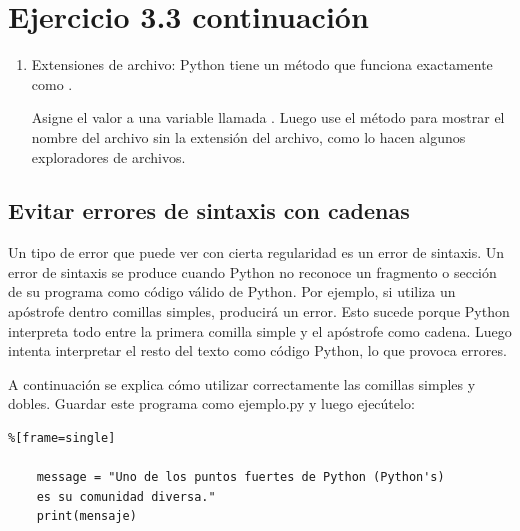 \section*{Ejercicio 3.3 continuación}\label{Tarea3}

\begin{enumerate}[3.3.5]
	
	\item Extensiones de archivo: Python tiene un método {} que funciona exactamente
	como {}. 
	
	Asigne el valor {} a una variable llamada
	{}. Luego use el método {} para mostrar el nombre del archivo sin
	la extensión del archivo, como lo hacen algunos exploradores de archivos.
	
\end{enumerate}

\subsection{Evitar errores de sintaxis con cadenas}%

Un tipo de error que puede ver con cierta regularidad es un error de sintaxis. Un error de sintaxis se produce  cuando Python no reconoce un fragmento o  sección de su programa como código válido de  Python. Por ejemplo, si utiliza un apóstrofe dentro comillas simples, producirá un error. Esto sucede porque Python interpreta
todo entre la primera comilla simple y el apóstrofe como cadena. Luego intenta interpretar el resto del texto como código Python, lo que provoca errores.

A continuación se explica cómo utilizar correctamente las comillas simples y dobles. 
Guardar este programa como  {\ttfamily ejemplo.py} y luego ejecútelo:


\hspace{-2.1cm}{\ttfamily \scriptsize apostrofe}\vspace{-0.25cm}

\hspace{-1.2cm}{\ttfamily \scriptsize .py}\vspace{-0.77cm}
\begin{lstlisting}%[frame=single]
	
	message = "Uno de los puntos fuertes de Python (Python's) 
	es su comunidad diversa."
	print(mensaje)
\end{lstlisting}

